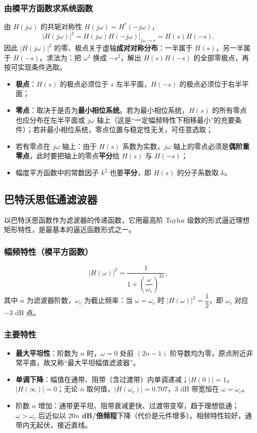 \subsubsection{由模平方函数求系统函数}
由 $H(j\omega)$ 的共轭对称性 $H(j\omega)=H^*(-j\omega)$，
\begin{equation}
\big|H(j\omega)\big|^2=H(j\omega)H(-j\omega)\Big|_{j\omega\to s}=H(s)H(-s).
\end{equation}
因此 $|H(j\omega)|^2$ 的零、极点关于虚轴\textbf{成对对称分布}：一半属于 $H(s)$，另一半属于 $H(-s)$。求法为：把 $\omega^2$ 换成 $-s^2$，解出 $H(s)H(-s)$ 的全部零极点，再按可实现条件选取。
\begin{itemize}
\item \textbf{极点}：$H(s)$ 的极点必须位于 $s$ 左半平面，$H(-s)$ 的极点必须位于右半平面；
\item \textbf{零点}：取决于是否为\textbf{最小相位系统}。若为最小相位系统，$H(s)$ 的所有零点也应分布在左半平面或 $j\omega$ 轴上（这是“一定幅频特性下相移最小”的充要条件）；若非最小相位系统，零点位置与稳定性无关，可任意选取；
\item 若有零点在 $j\omega$ 轴上：由于 $H(s)$ 系数为实数，$j\omega$ 轴上的零点必须是\textbf{偶阶重零点}，此时要把轴上的零点\textbf{平分}给 $H(s)$ 与 $H(-s)$；
\item 幅度平方函数中的常数因子 $k^2$ 也要\textbf{平分}，即 $H(s)$ 的分子系数取 $k$。
\end{itemize}

\subsection{巴特沃思低通滤波器}
以巴特沃思函数作为滤波器的传递函数，它用最高阶 Taylor 级数的形式逼近理想矩形特性，是最基本的逼近函数形式之一。

\subsubsection{幅频特性（模平方函数）}
\begin{equation}
\big|H(\omega)\big|^2=\frac{1}{1+\left(\dfrac{\omega}{\omega_c}\right)^{2n}},
\end{equation}
其中 $n$ 为滤波器阶数，$\omega_c$ 为截止频率：当 $\omega=\omega_c$ 时 $|H(\omega)|^2=\dfrac{1}{2}$，即 $\omega_c$ 对应 $-3$ dB 点。

\subsubsection{主要特性}
\begin{itemize}
\item \textbf{最大平坦性}：阶数为 $n$ 时，$\omega=0$ 处前 $(2n-1)$ 阶导数均为零，原点附近非常平直，故又称“最大平坦幅值滤波器”。
\item \textbf{单调下降}：幅值在通带、阻带（含过渡带）内单调递减；$|H(0)|=1$，$|H(\infty)|=0$；无论 $n$ 取何值，$|H(\omega_c)|=0.707$，3 dB 带宽恒在 $\omega=\omega_c$。
\item 阶数 $n$ 增加：通带更平坦、阻带衰减更快、过渡带变窄，趋于理想低通；$\omega>\omega_c$ 后近似以 \textbf{$20n$ dB/倍频程}下降（代价是元件增多）。相频特性较好，通带内无起伏，接近直线。
\end{itemize}

